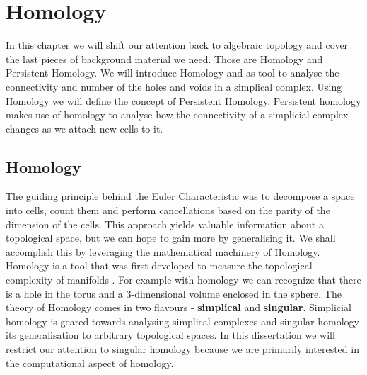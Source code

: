 \chapter{Homology}
\label{chapter5}

In this chapter we will shift our attention back to algebraic topology and cover the last pieces of background material we need. Those are Homology and Persistent Homology. We will introduce Homology and as tool to analyse the connectivity and number of the holes and voids in a simplical complex. Using Homology we will define the concept of Persistent Homology. Persistent homology makes use of homology to analyse how the connectivity of a simplicial complex changes as we attach new cells to it.

\section{Homology}

The guiding principle behind the Euler Characteristic was to decompose a space into cells, count them and perform cancellations based on the parity of the dimension of the cells. This approach yields valuable information about a topological space, but we can hope to gain more by generalising it. We shall accomplish this by leveraging the mathematical machinery of Homology. Homology is a tool that was first developed to measure the topological complexity of manifolds \cite{persistence-original}. For example with homology we can recognize that there is a hole in the torus and a 3-dimensional volume enclosed in the sphere. The theory of Homology comes in two flavours - \textbf{simplical} and \textbf{singular}. Simplicial homology is geared towards analysing simplical complexes and singular homology its generalisation to arbitrary topological spaces. In this dissertation we will restrict our attention to singular homology because we are primarily interested in the computational aspect of homology.

